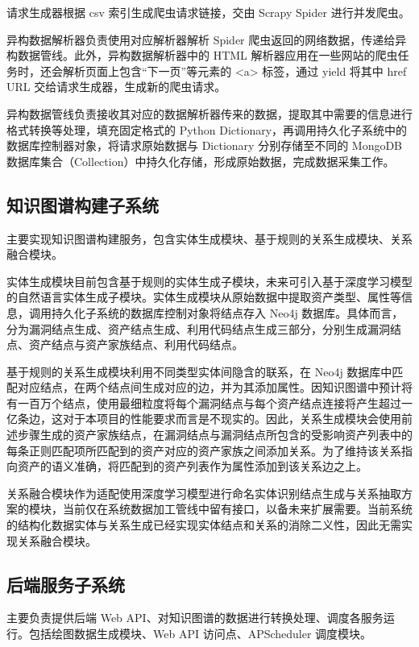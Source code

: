 \documentclass[a4paper,AutoFakeBold,oneside,12pt]{book}
\begin{document}
请求生成器根据 csv 索引生成爬虫请求链接，交由 Scrapy Spider 进行并发爬虫。

异构数据解析器负责使用对应解析器解析 Spider 爬虫返回的网络数据，传递给异构数据管线。此外，异构数据解析器中的 HTML 解析器应用在一些网站的爬虫任务时，还会解析页面上包含“下一页”等元素的 <a> 标签，通过 yield 将其中 href URL 交给请求生成器，生成新的爬虫请求。

异构数据管线负责接收其对应的数据解析器传来的数据，提取其中需要的信息进行格式转换等处理，填充固定格式的 Python Dictionary，再调用持久化子系统中的数据库控制器对象，将请求原始数据与 Dictionary 分别存储至不同的 MongoDB 数据库集合（Collection）中持久化存储，形成原始数据，完成数据采集工作。

\subsection{知识图谱构建子系统\label{知识图谱构建子系统}}

主要实现知识图谱构建服务，包含实体生成模块、基于规则的关系生成模块、关系融合模块。

实体生成模块目前包含基于规则的实体生成子模块，未来可引入基于深度学习模型的自然语言实体生成子模块。实体生成模块从原始数据中提取资产类型、属性等信息，调用持久化子系统的数据库控制对象将结点存入 Neo4j 数据库。具体而言，分为漏洞结点生成、资产结点生成、利用代码结点生成三部分，分别生成漏洞结点、资产结点与资产家族结点、利用代码结点。

基于规则的关系生成模块利用不同类型实体间隐含的联系，在 Neo4j 数据库中匹配对应结点，在两个结点间生成对应的边，并为其添加属性。因知识图谱中预计将有一百万个结点，使用最细粒度将每个漏洞结点与每个资产结点连接将产生超过一亿条边，这对于本项目的性能要求而言是不现实的。因此，关系生成模块会使用前述步骤生成的资产家族结点，在漏洞结点与漏洞结点所包含的受影响资产列表中的每条正则匹配项所匹配到的资产对应的资产家族之间添加关系。为了维持该关系指向资产的语义准确，将匹配到的资产列表作为属性添加到该关系边之上。

关系融合模块作为适配使用深度学习模型进行命名实体识别结点生成与关系抽取方案的模块，当前仅在系统数据加工管线中留有接口，以备未来扩展需要。当前系统的结构化数据实体与关系生成已经实现实体结点和关系的消除二义性，因此无需实现关系融合模块。

\subsection{后端服务子系统}

主要负责提供后端 Web API、对知识图谱的数据进行转换处理、调度各服务运行。包括绘图数据生成模块、Web API 访问点、APScheduler 调度模块。
\end{document}
